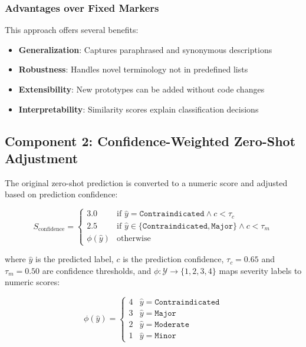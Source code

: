 \documentclass[11pt,a4paper]{article}
\begin{document}
\subsubsection{Advantages over Fixed Markers}

This approach offers several benefits:
\begin{itemize}
    \item \textbf{Generalization}: Captures paraphrased and synonymous descriptions
    \item \textbf{Robustness}: Handles novel terminology not in predefined lists
    \item \textbf{Extensibility}: New prototypes can be added without code changes
    \item \textbf{Interpretability}: Similarity scores explain classification decisions
\end{itemize}

\subsection{Component 2: Confidence-Weighted Zero-Shot Adjustment}

The original zero-shot prediction is converted to a numeric score and adjusted based on prediction confidence:

\begin{equation}
S_{\text{confidence}} = 
\begin{cases}
3.0 & \text{if } \hat{y} = \texttt{Contraindicated} \land c < \tau_c \\
2.5 & \text{if } \hat{y} \in \{\texttt{Contraindicated}, \texttt{Major}\} \land c < \tau_m \\
\phi(\hat{y}) & \text{otherwise}
\end{cases}
\end{equation}

where $\hat{y}$ is the predicted label, $c$ is the prediction confidence, $\tau_c = 0.65$ and $\tau_m = 0.50$ are confidence thresholds, and $\phi: \mathcal{Y} \to \{1, 2, 3, 4\}$ maps severity labels to numeric scores:

\begin{equation}
\phi(\hat{y}) = \begin{cases}
4 & \hat{y} = \texttt{Contraindicated} \\
3 & \hat{y} = \texttt{Major} \\
2 & \hat{y} = \texttt{Moderate} \\
1 & \hat{y} = \texttt{Minor}
\end{cases}
\end{equation}
\end{document}
